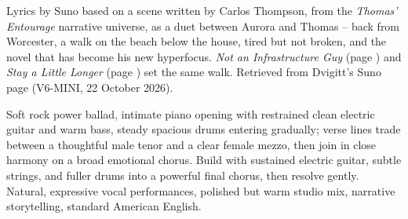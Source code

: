 
\label{sec:where-the-tide-turns}
\begin{notes}
Lyrics by Suno based on a scene written by Carlos Thompson, from the \emph{Thomas' Entourage} narrative universe, as a duet between Aurora and Thomas -- back from Worcester, a walk on the beach below the house, tired but not broken, and the novel that has become his new hyperfocus. \emph{Not an Infrastructure Guy} (page \pageref{sec:not-an-infrastructure-guy}) and \emph{Stay a Little Longer} (page \pageref{sec:stay-a-little-longer}) set the same walk. Retrieved from Dvigitt's Suno page (V6-MINI, 22 October 2026).
\end{notes}
\begin{style}
Soft rock power ballad, intimate piano opening with restrained clean electric guitar and warm bass, steady spacious drums entering gradually; verse lines trade between a thoughtful male tenor and a clear female mezzo, then join in close harmony on a broad emotional chorus. Build with sustained electric guitar, subtle strings, and fuller drums into a powerful final chorus, then resolve gently. Natural, expressive vocal performances, polished but warm studio mix, narrative storytelling, standard American English.
\end{style}
